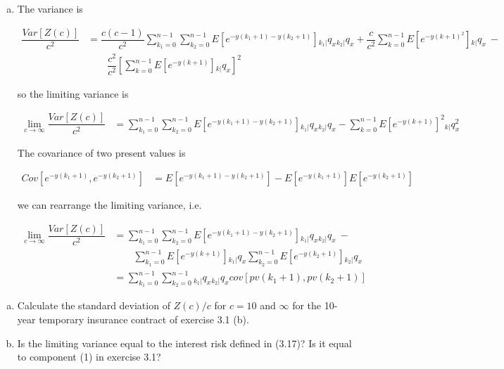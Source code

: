 \documentclass[12pt]{article}
\numberwithin{questioncounter}{section}
\begin{document}
\begin{solution}

\begin{enumerate}[(a)]
\item The variance is

\begin{align*}
\dfrac{Var[Z(c)]}{c^2} &= \dfrac{c(c-1)}{c^2} \sum_{k_{1}=0}^{n - 1} \sum_{k_{2} = 0}^{n - 1} E[e^{-y(k_{1} + 1) - y(k_{2} + 1)}] {}_{k_{1}|}q_{x} {}_{k_{2}|}q_{x} + \dfrac{c}{c^2} \sum_{k=0}^{n - 1} E[e^{-y(k+1)^2}] {}_{k|}q_{x} \ - \\
&\qquad \dfrac{c^2}{c^{2}} \left[ \sum_{k=0}^{n-1} E[e^{-y(k+1)}] {}_{k|}q_{x} \right]^{2}
\end{align*}

so the limiting variance is

\begin{align*}
\lim_{c\to \infty} \dfrac{Var[Z(c)]}{c^2} &= \sum_{k_{1}=0}^{n-1} \sum_{k_{2} = 0}^{n-1} E[e^{-y(k_{1} + 1) - y(k_{2} + 1)}] {}_{k_{1}|}q_{x} {}_{k_{2}|}q_{x} - \sum_{k=0}^{n-1} E[e^{-y(k+1)}]^{2} {}_{k|}q_{x}^{2}
\end{align*}

The covariance of two present values is

\begin{align*}
Cov[e^{-y(k_{1} + 1)}, e^{-y(k_{2} + 1)}] &= E[e^{-y(k_{1} + 1) - y(k_{2} + 1)}] - E[e^{-y(k_{1} + 1)}]  E[e^{-y(k_{2} + 1)}]
\end{align*}

we can rearrange the limiting variance, i.e.

\begin{align*}
\lim_{c \to \infty} \dfrac{Var[Z(c)]}{c^2} &= \sum_{k_{1}=0}^{n-1} \sum_{k_{2} = 0}^{n-1} E[e^{-y(k_{1} + 1) - y(k_{2} + 1)}] {}_{k_{1}|}q_{x} {}_{k_{2}|}q_{x}  \ - \\
&\qquad \sum_{k_{1} = 0}^{n-1} E[e^{-y(k+1)}] {}_{k_{1}|}q_{x} \sum_{k_{2} = 0}^{n-1} E[e^{-y(k_{2} + 1)}]{}_{k_{2}|}q_{x} \\
&= \sum_{k_{1}=0}^{n-1} \sum_{k_{2} = 0}^{n-1} {}_{k_{1}|}q_{x} {}_{k_{2}|}q_{x} cov[pv(k_{1}+1), pv(k_{2}+1)]
\end{align*}

\end{enumerate}

\end{solution}

\begin{question}
\begin{enumerate}[(a)]
\item Calculate the standard deviation of $Z(c)/c$ for $c = 10$ and $\infty$ for the 10-year temporary insurance contract of exercise 3.1 (b).
\item Is the limiting variance equal to the interest risk defined in (3.17)? Is it equal to component (1) in exercise 3.1?
\end{enumerate}
\end{question}
\end{document}
